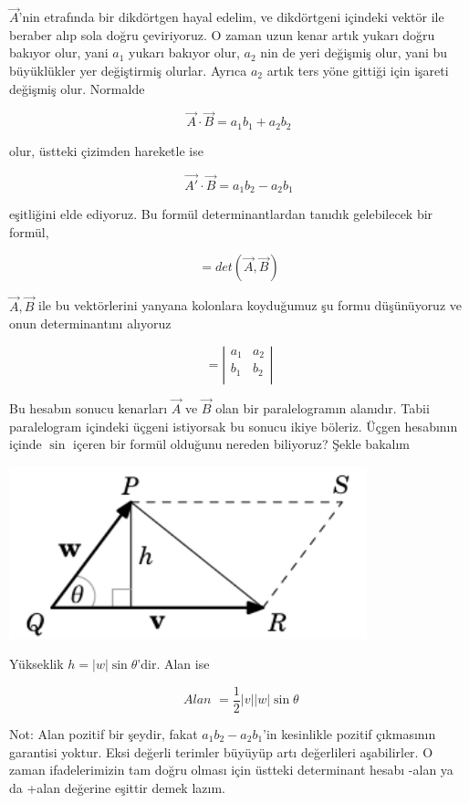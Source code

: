 \documentclass[12pt,fleqn]{article}\usepackage{../../common}
\begin{document}
$\vec{A}$'nin etrafında bir dikdörtgen hayal edelim, ve dikdörtgeni içindeki
vektör ile beraber alıp sola doğru çeviriyoruz. O zaman uzun kenar artık yukarı
doğru bakıyor olur, yani $a_1$ yukarı bakıyor olur, $a_2$ nin de yeri değişmiş
olur, yani bu büyüklükler yer değiştirmiş olurlar. Ayrıca $a_2$ artık ters yöne
gittiği için işareti değişmiş olur. Normalde

$$ \vec{A}\cdot\vec{B} = a_1b_1 + a_2b_2 $$

olur, üstteki çizimden hareketle ise

$$ \vec{A'} \cdot \vec{B} = a_1b_2 - a_2b_1 $$

eşitliğini elde ediyoruz. Bu formül determinantlardan tanıdık gelebilecek bir 
formül, 

$$ = det(\vec{A},\vec{B}) $$

$\vec{A},\vec{B}$ ile bu vektörlerini yanyana kolonlara koyduğumuz şu formu
düşünüyoruz ve onun determinantını alıyoruz

$$ =
\left|\begin{array}{rr}
a_1 & a_2 \\
b_1 & b_2 \\
\end{array}\right|
 $$

Bu hesabın sonucu kenarları $\vec{A}$ ve $\vec{B}$ olan bir paralelogramın
alanıdır.  Tabii paralelogram içindeki üçgeni istiyorsak bu sonucu ikiye
böleriz. Üçgen hesabının içinde $\sin$ içeren bir formül olduğunu nereden 
biliyoruz?
Şekle bakalım

\begin{center}
\includegraphics[height=5cm]{triangle.png}
\end{center}
Yükseklik $h=|w|\sin\theta$'dir. Alan ise

$$ \textit{ Alan } = \frac{1}{2}|v||w|\sin\theta $$

Not: Alan pozitif bir şeydir, fakat $a_1b_2 - a_2b_1$'in kesinlikle pozitif
çıkmasının garantisi yoktur. Eksi değerli terimler büyüyüp artı değerlileri
aşabilirler. O zaman ifadelerimizin tam doğru olması için üstteki determinant
hesabı -alan ya da +alan değerine eşittir demek lazım.
\end{document}
